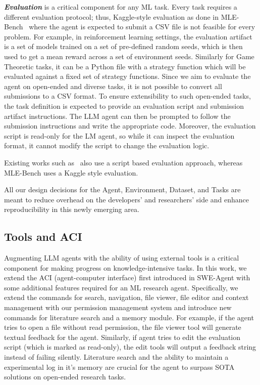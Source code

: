 \documentclass[]{fairmeta}
\newcommand{\ibold}[1]{\textbf{\textit{#1}}}
\begin{document}
\ibold{Evaluation} is a critical component for any ML task.
% 
Every task requires a different evaluation protocol; thus, Kaggle-style evaluation as done in MLE-Bench~\citep{chanMLEbenchEvaluatingMachine2024} where the agent is expected to submit a CSV file is not feasible for every problem. 
For example, in reinforcement learning settings, the evaluation artifact is a set of models trained on a set of pre-defined random seeds, which is then used to get a mean reward across a set of environment seeds. Similarly for Game Theoretic tasks, it can be a Python file with a strategy function which will be evaluated against a fixed set of strategy functions.
%
Since we aim to evaluate the agent on open-ended and diverse tasks, it is not possible to convert all submissions to a CSV format.
%
To ensure extensibility to such open-ended tasks, the task definition is expected to provide an evaluation script and submission artifact instructions.
%
The LLM agent can then be prompted to follow the submission instructions and write the appropriate code.
%
Moreover, the evaluation script is read-only for the LM agent, so while it can inspect the evaluation format, it cannot modify the script to change the evaluation logic.

Existing works such as~\citet{huangMLAgentBenchEvaluatingLanguage2024,rebench-metr,chenScienceAgentBenchRigorousAssessment2024} also use a script based evaluation approach, whereas MLE-Bench \citep{chanMLEbenchEvaluatingMachine2024} uses a Kaggle style evaluation.

% 
All our design decisions for the Agent, Environment, Dataset, and Tasks are meant to reduce overhead on the developers' and researchers' side and enhance reproducibility in this newly emerging area.


\subsection{Tools and ACI}
\label{sec:tools}
Augmenting LLM agents with the ability of using external tools is a critical component for making progress on knowledge-intensive tasks.
%
In this work, we extend the ACI (agent-computer interface) first introduced in SWE-Agent \citep{yangSWEagentAgentComputerInterfaces2024} with some additional features required for an ML research agent. 
%
Specifically, we extend the commands for search, navigation, file viewer, file editor and context management with our permission management system and introduce new commands for literature search and a memory module.
For example, if the agent tries to open a file without read permission, the file viewer tool will generate textual feedback for the agent. Similarly, if agent tries to edit the evaluation script (which is marked as read-only), the edit tools will output a feedback string instead of failing silently.
Literature search and the ability to maintain a experimental log in it's memory are crucial for the agent to surpass SOTA solutions on open-ended research tasks.
%
\end{document}
